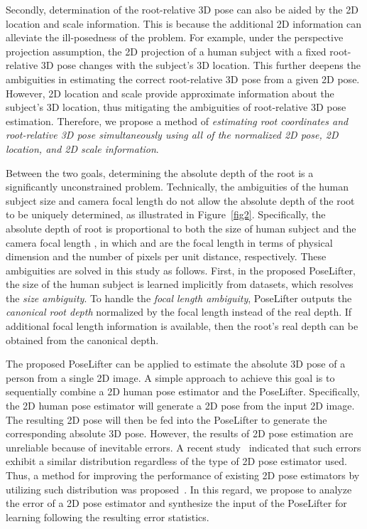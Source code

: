 \documentclass[10pt,twocolumn,letterpaper]{article}
\begin{document}
Secondly, determination of the root-relative 3D pose can also be aided by the 2D location and scale information. This is because the additional 2D information can alleviate the ill-posedness of the problem. For example, under the perspective projection assumption, the 2D projection of a human subject with a fixed root-relative 3D pose changes with the subject's 3D location. This further deepens the ambiguities in estimating the correct root-relative 3D pose from a given 2D pose. However, 2D location and scale provide approximate information about the subject's 3D location, thus mitigating the ambiguities of root-relative 3D pose estimation. Therefore, we propose a method of \textit{estimating root coordinates and root-relative 3D pose simultaneously using all of the normalized 2D pose, 2D location, and 2D scale information}.

Between the two goals, determining the absolute depth of the root is a significantly unconstrained problem. Technically, the ambiguities of the human subject size and camera focal length do not allow the absolute depth of the root to be uniquely determined, as illustrated in Figure~\ref{fig2}. Specifically, the absolute depth of root is proportional to both the size of human subject  and the camera focal length , in which  and  are the focal length in terms of physical dimension and the number of pixels per unit distance, respectively. These ambiguities are solved in this study as follows. First, in the proposed PoseLifter, the size of the human subject is learned implicitly from datasets, which resolves the \textit{size ambiguity}. To handle the \textit{focal length ambiguity}, PoseLifter outputs the \textit{canonical root depth} normalized by the focal length instead of the real depth. If additional focal length information is available, then the root's real depth can be obtained from the canonical depth.

The proposed PoseLifter can be applied to estimate the absolute 3D pose of a person from a single 2D image. A simple approach to achieve this goal is to sequentially combine a 2D human pose estimator and the PoseLifter. Specifically, the 2D human pose estimator will generate a 2D pose from the input 2D image. The resulting 2D pose will then be fed into the PoseLifter to generate the corresponding absolute 3D pose. However, the results of 2D pose estimation are unreliable because of inevitable errors. A recent study~\cite{Ronchi2017} indicated that such errors exhibit a similar distribution regardless of the type of 2D pose estimator used. Thus, a method for improving the performance of existing 2D pose estimators by utilizing such distribution was proposed~\cite{Moon2019}. In this regard, we propose to analyze the error of a 2D pose estimator and synthesize the input of the PoseLifter for learning following the resulting error statistics.
\end{document}
